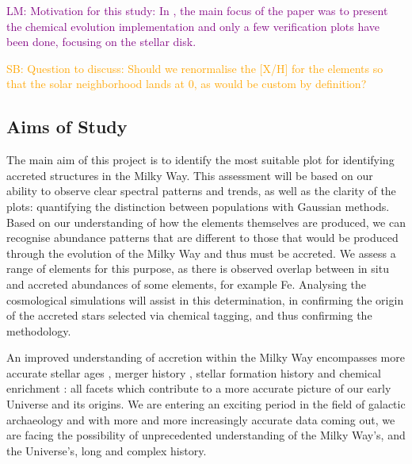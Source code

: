 \documentclass[fleqn,usenatbib]{mnras}
\newcommand{\LM}[1]{{\textcolor{purple}{LM: #1}}}
\newcommand{\SB}[1]{{\textcolor{orange}{SB: #1}}}
\begin{document}
\LM{Motivation for this study: In \citet{Buck2021}, the main focus of the paper was to present the chemical evolution implementation and only a few verification plots have been done, focusing on the stellar disk.}


\SB{Question to discuss: Should we renormalise the [X/H] for the elements so that the solar neighborhood lands at 0, as would be custom by definition?}

\subsection{Aims of Study} 

The main aim of this project is to identify the most suitable plot for identifying accreted structures in the Milky Way. This assessment will be based on our ability to observe clear spectral patterns and trends, as well as the clarity of the plots: quantifying the distinction between populations with Gaussian methods. Based on our understanding of how the elements themselves are produced, we can recognise abundance patterns that are different to those that would be produced through the evolution of the Milky Way and thus must be accreted. We assess a range of elements for this purpose, as there is observed overlap between in situ and accreted abundances of some elements, for example Fe.  Analysing the cosmological simulations will assist in this determination, in confirming the origin of the accreted stars selected via chemical tagging, and thus confirming the methodology.

An improved understanding of accretion within the Milky Way encompasses more accurate stellar ages \citep{Das2020}, merger history \citep{Naidu2020}, stellar formation history and chemical enrichment \citep{DeSilva2015}: all facets which contribute to a more accurate picture of our early Universe and its origins. We are entering an exciting period in the field of galactic archaeology and with more and more increasingly accurate data coming out, we are facing the possibility of unprecedented understanding of the Milky Way’s, and the Universe’s, long and complex history.
\end{document}
